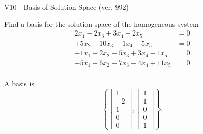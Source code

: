 \begin{exercise}
  \begin{exerciseTitle}V10 - Basis of Solution Space (ver. 992)\end{exerciseTitle}
  \begin{exerciseStatement}
    Find a basis for the solution space of the homogeneous system 
\begin{align*}
 2 x_ 1 -2 x_ 3 + 3 x_ 4 -2 x_ 5 &= 0  \\ 
  + 5 x_ 2 + 10 x_ 3 + 1 x_ 4 -5 x_ 5 &= 0  \\ 
  -1 x_ 1 + 2 x_ 2 + 5 x_ 3 + 3 x_ 4 -1 x_ 5 &= 0  \\ 
  -5 x_ 1 -6 x_ 2 -7 x_ 3 -4 x_ 4 + 11 x_ 5 &= 0  \\ 
 \end{align*}


 
  \end{exerciseStatement}

  \begin{exerciseAnswer}
   A basis is   
\[\left\{\left[\begin{array}{c}
1 \\
-2 \\
1 \\
0 \\
0
\end{array}\right] , \left[\begin{array}{c}
1 \\
1 \\
0 \\
0 \\
1
\end{array}\right]\right\}.\]

  


  \end{exerciseAnswer}
\end{exercise}